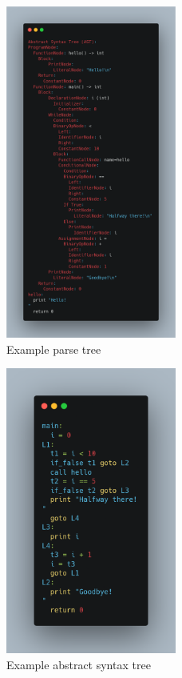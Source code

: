 \documentclass[12pt, letterpaper]{article}
\begin{document}
\begin{figure}[H]
    \centering
    \includegraphics[width=0.5\textwidth]{3.png}
    \caption{Example parse tree}
    \label{fig:example_parse_tree}
\end{figure}

\begin{figure}[H]
    \centering
    \includegraphics[width=0.5\textwidth]{4.png}
    \caption{Example abstract syntax tree}
    \label{fig:example_abstract_syntax_tree}
\end{figure}
\end{document}
